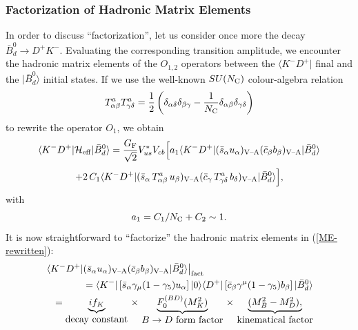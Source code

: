 \documentclass[12pt]{article}
\begin{document}
\subsubsection{Factorization of Hadronic Matrix Elements}\label{ssec:ME-fact}
%
%
%
In order to discuss ``factorization'', let us consider once more 
the decay $\bar B^0_d\to D^+K^-$. Evaluating the corresponding 
transition amplitude, we encounter the hadronic matrix elements of the 
$O_{1,2}$ operators between the $\langle K^-D^+|$ final and the 
$|\bar B^0_d\rangle$ initial states. If we use the well-known 
$SU(N_{\rm C})$ colour-algebra relation
\begin{equation}
T^a_{\alpha\beta}T^a_{\gamma\delta}=\frac{1}{2}\left(\delta_{\alpha\delta}
\delta_{\beta\gamma}-\frac{1}{N_{\rm C}}\delta_{\alpha\beta}
\delta_{\gamma\delta}\right)
\end{equation}
to rewrite the operator $O_1$, we obtain
\begin{displaymath}
\langle K^-D^+|{\cal H}_{\rm eff}|\bar B^0_d\rangle=
\frac{G_{\rm F}}{\sqrt{2}}V_{us}^\ast V_{cb}\Bigl[a_1\langle K^-D^+|
(\bar s_\alpha u_\alpha)_{\mbox{{\scriptsize V--A}}}
(\bar c_\beta b_\beta)_{\mbox{{\scriptsize V--A}}}
|\bar B^0_d\rangle
\end{displaymath}
\vspace*{-0.3truecm}
\begin{equation}\label{ME-rewritten}
+2\,C_1\langle K^-D^+|
(\bar s_\alpha\, T^a_{\alpha\beta}\,u_\beta)_{\mbox{{\scriptsize 
V--A}}}(\bar c_\gamma 
\,T^a_{\gamma\delta}\,b_\delta)_{\mbox{{\scriptsize V--A}}}
|\bar B^0_d\rangle\Bigr],\nonumber
\end{equation}
with
\begin{equation}\label{a1-def}
a_1=C_1/N_{\rm C}+C_2 \sim 1.
\end{equation}
It is now straightforward to ``factorize'' the hadronic matrix elements
in (\ref{ME-rewritten}):
\begin{eqnarray}
\lefteqn{\left.\langle K^-D^+|
(\bar s_\alpha u_\alpha)_{\mbox{{\scriptsize 
V--A}}}(\bar c_\beta b_\beta)_{\mbox{{\scriptsize V--A}}}
|\bar B^0_d\rangle\right|_{\rm fact}}\nonumber\\
&&=\langle K^-|\left[\bar s_\alpha\gamma_\mu(1-\gamma_5)u_\alpha\right]
|0\rangle\langle D^+|\left[\bar c_\beta\gamma^\mu
(1-\gamma_5)b_\beta\right]|\bar B^0_d\rangle\nonumber\\
&&=\underbrace{i f_K}_{\mbox{decay constant}} \, \times \, 
\underbrace{F^{(BD)}_0(M_K^2)}_{\mbox{$B\to D$ form factor}} 
\, \times \,\underbrace{(M_B^2-M_D^2),}_{\mbox{kinematical factor}}
\end{eqnarray}
\end{document}
